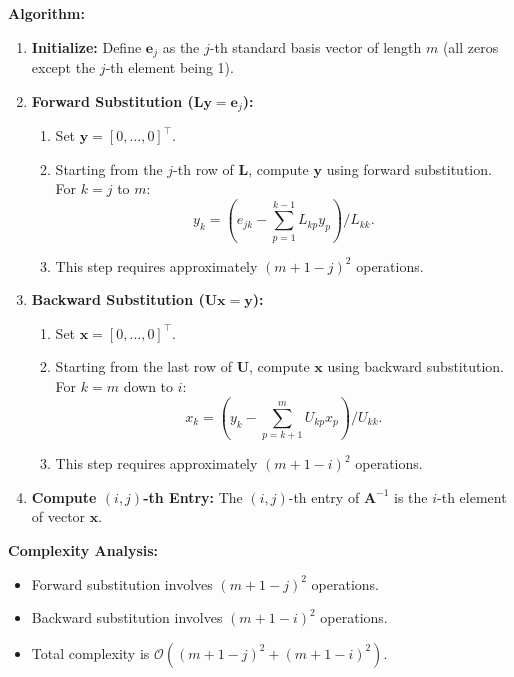 \documentclass{article}
\begin{document}
\textbf{Algorithm:}

\begin{enumerate}
    \item \textbf{Initialize:}
    Define $\boldsymbol{e}_j$ as the $j$-th standard basis vector of length $m$ (all zeros except the $j$-th element being 1).

    \item \textbf{Forward Substitution ($\boldsymbol{L} \boldsymbol{y} = \boldsymbol{e}_j$):}
    \begin{enumerate}
        \item Set $\boldsymbol{y} = [0, \ldots, 0]^{\top}$.
        \item Starting from the $j$-th row of $\boldsymbol{L}$, compute $\boldsymbol{y}$ using forward substitution. For $k = j$ to $m$:
        \begin{equation}
            y_k = \left(e_{j k} - \sum_{p=1}^{k-1} L_{k p} y_p\right) / L_{k k}.
        \end{equation}
        \item This step requires approximately $(m+1-j)^2$ operations.
    \end{enumerate}

    \item \textbf{Backward Substitution ($\boldsymbol{U} \boldsymbol{x} = \boldsymbol{y}$):}
    \begin{enumerate}
        \item Set $\boldsymbol{x} = [0, \ldots, 0]^{\top}$.
        \item Starting from the last row of $\boldsymbol{U}$, compute $\boldsymbol{x}$ using backward substitution. For $k = m$ down to $i$:
        \begin{equation}
            x_k = \left(y_k - \sum_{p=k+1}^m U_{k p} x_p\right) / U_{k k}.
        \end{equation}
        \item This step requires approximately $(m+1-i)^2$ operations.
    \end{enumerate}

    \item \textbf{Compute $(i, j)$-th Entry:}
    The $(i, j)$-th entry of $\boldsymbol{A}^{-1}$ is the $i$-th element of vector $\boldsymbol{x}$.
\end{enumerate}

\textbf{Complexity Analysis:}
\begin{itemize}
    \item Forward substitution involves $(m+1-j)^2$ operations.
    \item Backward substitution involves $(m+1-i)^2$ operations.
    \item Total complexity is $\mathcal{O}\left((m+1-j)^2+(m+1-i)^2\right)$.
\end{itemize}
\end{document}
